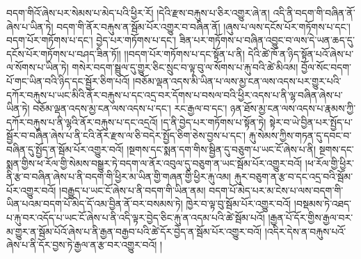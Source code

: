 བདག་གིའོ་ཞེས་པར་སེམས་པ་མེད་པའི་ཕྱིར་རོ། །དེའི་རྫས་བརྐུས་པ་ཅིར་འགྱུར་ཞེ་ན། འདི་ནི་བདག་གི་བཞིན་ནོ་ཞེས་པ་ཡིན་ཏེ། བདག་གི་ནོར་བརྐུས་ན་སྦོམ་པོར་འགྱུར་བ་བཞིན་ནོ། །ཞུས་པ་ལས་དངོས་པོར་གཏོགས་པ་དང་། བདག་པོར་གཏོགས་པ་དང་། བྱེད་པར་གཏོགས་པ་དང་། ཟིན་པར་གཏོགས་པ་བཞིན་འབྱུང་བ་ལས་དེ་ཡན་ཆད་དུ་དངོས་པོར་གཏོགས་པ་བཤད་ཟིན་ཏོ།། །།བདག་པོར་གཏོགས་པ་དང་སྟོན་པ་ནི། དེའི་ཚེ་ཁོ་ན་ཉིད་སྟོན་པའོ་ཞེས་པ་ལ་སོགས་པ་ཡིན་ཏེ། གསེར་བདག་སྦྲུལ་དུ་གྱུར་ཅིང་སྲུང་བ་ལྟ་བུ་ལ་སོགས་པ་རྐུ་བའི་ཚེ་མིའམ། བྱོལ་སོང་བདག་པོ་གང་ཡིན་བའི་ཉིད་དང་སྦྱོར་ཅིག་པའོ། །བཅོམ་ལྡན་འདས་མི་ཡིན་པ་ལས་མྱ་ངན་ལས་འདས་པར་གྱུར་པའི་དཀོར་བརྐུས་པ་ཡང་མིའི་ནོར་བརྐུས་པ་དང་འདྲ་བར་དོགས་པ་བསལ་བའི་ཕྱིར་འདས་པ་ནི་ལྷ་བཞིན་ཞེས་པ་ཡིན་ཏེ། བཅོམ་ལྡན་འདས་མྱ་ངན་ལས་འདས་པ་དང་། རང་རྒྱལ་བ་དང་། ཉན་ཐོས་མྱ་ངན་ལས་འདས་པ་རྣམས་ཀྱི་དཀོར་བརྐུས་པ་ནི་ལྷའི་ནོར་བརྐུས་པ་དང་འདྲའོ། །ད་ནི་བྱེད་པར་གཏོགས་པ་སྟོན་ཏེ། སྟེར་བ་ཡེ་བྱིན་པར་སྤྱོད་པ་སྦྱོར་བ་བཞིན་ཞེས་པ་ནི་ངའི་ནོར་རྫས་ལ་ཅི་བདེར་སྤྱོད་ཅིག་ཅེས་བྱས་པ་དང་། རྐུ་སེམས་ཀྱིས་གཏན་དུ་དབང་བ་བཞིན་དུ་སྤྱོད་ན་སྦོམ་པོར་འགྱུར་བའོ། །སྔགས་དང་སྨན་དག་གིས་སྦྱིན་དུ་བཅུག་པ་ཡང་ངོ་ཞེས་པ་ནི། སྔགས་དང་སྨན་གྱིས་ཕ་རོལ་གྱི་སེམས་བསྒྱུར་ཏེ་བདག་ལ་ནོར་འབུལ་དུ་བཅུག་ན་ཡང་སྦོམ་པོར་འགྱུར་བའོ། །ཕ་རོལ་གྱི་ཕྱིར་ནི་རྩ་བ་བཞིན་ཞེས་པ་ནི་བདག་གི་ཕྱིར་མ་ཡིན་གྱི་གཞན་གྱི་ཕྱིར་རྐུ་འམ། རྐུར་བཅུག་ན་རྩ་བ་དང་འདྲ་བའི་སྦོམ་པོར་འགྱུར་བའོ། །བརྒྱུད་པ་ཡང་ངོ་ཞེས་པ་ནི་བདག་གི་ཡིན་ནམ། བདག་པོ་མེད་པར་མ་ངེས་པ་ལས་བདག་གི་ཡིན་པའམ་བདག་པོ་མེད་དོ་འམ་བྱིན་ནོ་བར་བསམས་ཏེ། ཁྱེར་བ་ལྟ་བུ་སྦོམ་པོར་འགྱུར་བའོ། །བསྡམས་ཏེ་འཐད་པ་རྐུ་བར་འདོད་པ་ཡང་ངོ་ཞེས་པ་ནི་འདི་ལྟར་བྱེད་ཅིང་རྐུ་ན་འདམ་པའི་ཚེ་སྦོམ་པའོ། །རྒྱན་པོ་དོར་གྱིས་རྒྱལ་བར་མ་གྱུར་ན་སྦོམ་པོའོ་ཞེས་པ་ནི་རྒྱན་བརྒྱབ་པའི་ཚེ་དོར་བྱེད་ན་སྦོམ་པོར་འགྱུར་བའོ། །འདིར་དེས་ན་བརྐུས་པའོ་ཞེས་པ་ནི་དོར་བྱས་ཏེ་རྒྱལ་ན་རྩ་བར་འགྱུར་བའོ། །
